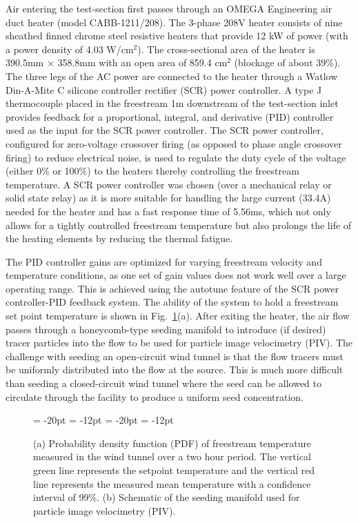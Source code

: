 Air entering the test-section first passes through an OMEGA Engineering air duct heater (model CABB-1211/208). 
The 3-phase 208V heater consists of nine sheathed finned chrome steel resistive heaters that provide 12 kW of power (with a power density of 4.03 W/cm$^2$). 
The cross-sectional area of the heater is 390.5mm $\times$ 358.8mm with an open area of 859.4 cm$^2$ (blockage of about 39\%). 
The three legs of the AC power are connected to the heater through a Watlow Din-A-Mite C silicone controller rectifier (SCR) power controller. 
A type J thermocouple placed in the freestream 1m downstream of the test-section inlet provides feedback for a proportional, integral, and derivative (PID) controller used as the input for the SCR power controller. 
The SCR power controller, configured for zero-voltage crossover firing (as opposed to phase angle crossover firing) to reduce electrical noise, is used to regulate the duty cycle of the voltage (either 0\% or 100\%) to the heaters thereby controlling the freestream temperature. 
A SCR power controller was chosen (over a mechanical relay or solid state relay) as it is more suitable for handling the large current (33.4A) needed for the heater and has a fast response time of 5.56ms, which not only allows for a tightly controlled freestream temperature but also prolongs the life of the heating elements by reducing the thermal fatigue.

The PID controller gains are optimized for varying freestream velocity and temperature conditions, as one set of gain values does not work well over a large operating range. 
This is achieved using the autotune feature of the SCR power controller-PID feedback system. 
The ability of the system to hold a freestream set point temperature is shown in Fig.~\ref{fig:inlet}(a). 
After exiting the heater, the air flow passes through a honeycomb-type seeding manifold to introduce (if desired) tracer particles into the flow to be used for particle image velocimetry (PIV).
The challenge with seeding an open-circuit wind tunnel is that the flow tracers must be uniformly distributed into the flow at the source. 
This is much more difficult than seeding a closed-circuit wind tunnel where the seed can be allowed to circulate through the facility to produce a uniform seed concentration. 

\begin{figure}[t!]
  \begin{center}
  {\subfigcapskip = -20pt \subfigcapmargin = -12pt }
   {\subfigcapskip = -20pt \subfigcapmargin = -12pt  }
  \end{center}
 \caption{\label{fig:Virk_model} (a) Probability density function (PDF) of freestream temperature measured in the wind tunnel over a two hour period. The vertical green line represents the setpoint temperature and the vertical red line represents the measured mean temperature with a confidence interval of 99\%. (b) Schematic of the seeding manifold used for particle image velocimetry (PIV).}  
\label{fig:inlet}
\end{figure}

